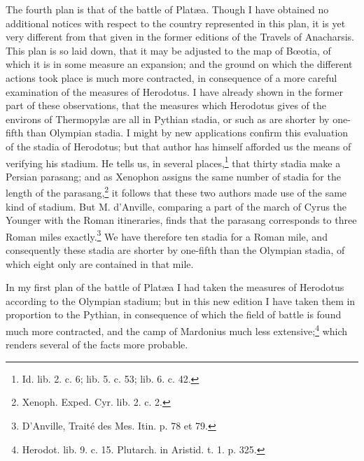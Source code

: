\documentclass[a4paper, 11pt, oneside, polutonikogreek, english]{article}
\begin{document}
The fourth plan is that of the battle of Platæa. Though I have obtained no additional notices with respect to the country represented in this plan, it is yet very different from that given in the former editions of the Travels of Anacharsis. This plan is so laid down, that it may be adjusted to the map of Bœotia, of which it is in some measure an expansion; and the ground on which the different actions took place is much more contracted, in consequence of a more careful examination of the measures of Herodotus. I have already shown in the former part of these observations, that the measures which Herodotus gives of the environs of Thermopylæ are all in Pythian stadia, or such as are shorter by one-fifth than Olympian stadia. I might by new applications confirm this evaluation of the stadia of Herodotus; but that author has himself afforded us the means of verifying his stadium. He tells us, in several places,\footnote{Id. lib. 2. c. 6; lib. 5. c. 53; lib. 6. c. 42.} that thirty stadia make a Persian parasang; and as Xenophon assigns the same number of stadia for the length of the parasang,\footnote{Xenoph. Exped. Cyr. lib. 2. c. 2.} it follows that these two authors made use of the same kind of stadium. But M. d'Anville, comparing a part of the march of Cyrus the Younger with the Roman itineraries, finds that the parasang corresponds to three Roman miles exactly.\footnote{D'Anville, Traité des Mes. Itin. p. 78 et 79.} We have therefore ten stadia for a Roman mile, and consequently these stadia are shorter by one-fifth than the Olympian stadia, of which eight only are contained in that mile.

In my first plan of the battle of Platæa I had taken the measures of Herodotus according to the Olympian stadium; but in this new edition I have taken them in proportion to the Pythian, in consequence of which the field of battle is found much more contracted, and the camp of Mardonius much less extensive;\footnote{Herodot. lib. 9. c. 15. Plutarch. in Aristid. t. 1. p. 325.} which renders several of the facts more probable.
\end{document}
